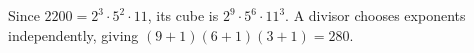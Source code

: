 Since $2200=2^3\cdot 5^2\cdot 11$, its cube is $2^9\cdot 5^6\cdot 11^3$. A divisor chooses exponents independently, giving $(9+1)(6+1)(3+1)=\boxed{280}$.

